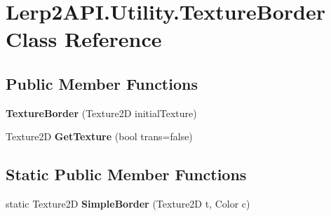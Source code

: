 \hypertarget{class_lerp2_a_p_i_1_1_utility_1_1_texture_border}{}\section{Lerp2\+A\+P\+I.\+Utility.\+Texture\+Border Class Reference}
\label{class_lerp2_a_p_i_1_1_utility_1_1_texture_border}
\subsection*{Public Member Functions}
\begin{DoxyCompactItemize}
\item 
\mbox{\label{class_lerp2_a_p_i_1_1_utility_1_1_texture_border_a6027a401443b51f04e868ecf2ec47665}} 
{\bfseries Texture\+Border} (Texture2D initial\+Texture)
\item 
\mbox{\label{class_lerp2_a_p_i_1_1_utility_1_1_texture_border_a60d2f15bfd5e17848c6e93b34cddad7c}} 
Texture2D {\bfseries Get\+Texture} (bool trans=false)
\end{DoxyCompactItemize}
\subsection*{Static Public Member Functions}
\begin{DoxyCompactItemize}
\item 
\mbox{\label{class_lerp2_a_p_i_1_1_utility_1_1_texture_border_aae0c5d1b848aa03831514ab53e2943c0}} 
static Texture2D {\bfseries Simple\+Border} (Texture2D t, Color c)
\end{DoxyCompactItemize}

